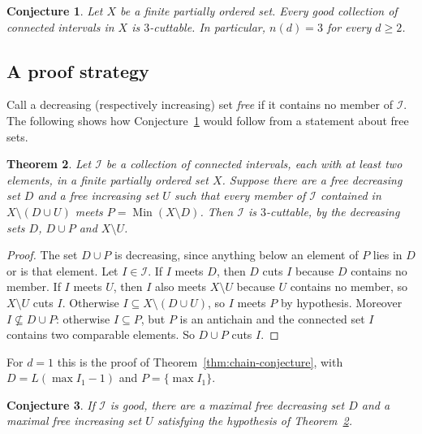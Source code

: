 \documentclass[10pt, a4paper]{article}
\theoremstyle{plain}
\newtheorem{theorem}{Theorem}[section]
\newtheorem{conjecture}[theorem]{Conjecture}
\theoremstyle{definition}
\newcommand{\I}{\mathcal{I}}
\begin{document}
\begin{conjecture}\label{conj:three}
  Let $X$ be a finite partially ordered set. Every good collection of connected
  intervals in $X$ is $3$-cuttable. In particular, $n(d)=3$ for every $d\ge 2$.
\end{conjecture}

\subsection{A proof strategy}

Call a decreasing (respectively increasing) set \emph{free} if it contains no member
of $\I$. The following shows how Conjecture~\ref{conj:three} would follow from a
statement about free sets.

\begin{theorem}\label{thm:three-cuts}
  Let $\I$ be a collection of connected intervals, each with at least two elements,
  in a finite partially ordered set $X$. Suppose there are a free decreasing set $D$
  and a free increasing set $U$ such that every member of $\I$ contained in
  $X\setminus(D\cup U)$ meets $P=\operatorname{Min}(X\setminus D)$. Then $\I$ is
  $3$-cuttable, by the decreasing sets $D$, $D\cup P$ and $X\setminus U$.
\end{theorem}

\begin{proof}
  The set $D\cup P$ is decreasing, since anything below an element of $P$ lies in $D$
  or is that element. Let $I\in\I$. If $I$ meets $D$, then $D$ cuts $I$ because $D$
  contains no member. If $I$ meets $U$, then $I$ also meets $X\setminus U$ because
  $U$ contains no member, so $X\setminus U$ cuts $I$. Otherwise
  $I\subseteq X\setminus(D\cup U)$, so $I$ meets $P$ by hypothesis. Moreover
  $I\not\subseteq D\cup P$: otherwise $I\subseteq P$, but $P$ is an antichain and
  the connected set $I$ contains two comparable elements. So $D\cup P$ cuts $I$.
\end{proof}

For $d=1$ this is the proof of Theorem~\ref{thm:chain-conjecture}, with
$D=L(\max I_1-1)$ and $P=\{\max I_1\}$.

\begin{conjecture}\label{conj:target}
  If $\I$ is good, there are a maximal free decreasing set $D$ and a maximal free
  increasing set $U$ satisfying the hypothesis of Theorem~\ref{thm:three-cuts}.
\end{conjecture}
\end{document}
